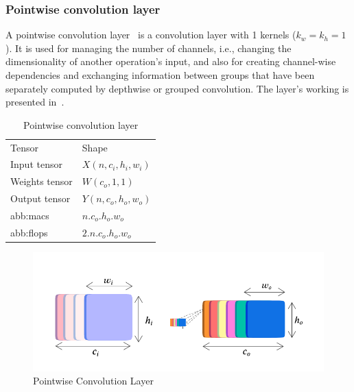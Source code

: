             
        \subsubsection{Pointwise convolution layer}
            A pointwise convolution layer~\cite{pointwise} is a convolution layer with 1  kernels ($k_w = k_h = 1$). It is used for managing the number of channels, i.e., changing the dimensionality of another operation's input, and also for creating channel-wise dependencies and exchanging information between groups that have been separately computed by depthwise or grouped convolution. The layer's working is presented in~.

            \begin{table}[hbt!]
            \caption{Pointwise convolution layer}
            \begin{tabularx}{\textwidth}{@{}XX@{}}
            \toprule
              Tensor &  Shape \\
              Input tensor &  $X(n, c_i,  h_i, w_i)$\\
              Weights tensor &  $W(c_o, 1, 1)$\\
              Output tensor  &  $Y(n, c_o, h_o, w_o)$\\
              \gls{abb:macs}  &  $n.c_o.h_o.w_o$\\
              \gls{abb:flops} &  $2.n.c_o.h_o.w_o$\\
            \bottomrule
            \end{tabularx}
            \end{table}

              \begin{figure}[hbt!]
                \begin{center}
                \includegraphics[width=.9\textwidth]{assets/images/pointwise.png}
                \end{center}
                \caption{Pointwise Convolution Layer}%
                \label{fig:hw-nas:dl:pointwise}
            \end{figure}
        
